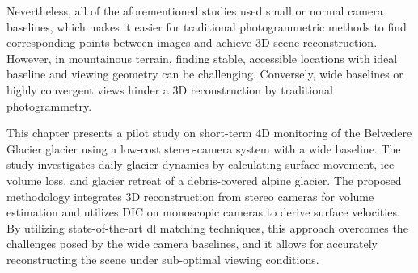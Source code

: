 Nevertheless, all of the aforementioned studies used small or normal camera baselines, which makes it easier for traditional photogrammetric methods to find corresponding
points between images and achieve 3D scene reconstruction.
However, in mountainous terrain, finding stable, accessible locations with ideal baseline and viewing geometry can be challenging.
Conversely, wide baselines or highly convergent views hinder a 3D reconstruction by traditional photogrammetry.



This chapter presents a pilot study on short-term 4D monitoring of the Belvedere Glacier glacier using a low-cost stereo-camera system with a wide baseline. 
The study investigates daily glacier dynamics by calculating surface movement, ice volume loss, and glacier retreat of a debris-covered alpine glacier.
The proposed methodology integrates 3D reconstruction from stereo cameras for volume estimation and utilizes DIC on monoscopic cameras to derive surface velocities.
By utilizing state-of-the-art \ac{dl} matching techniques, this approach overcomes the challenges posed by the wide camera baselines, and it allows for accurately
reconstructing the scene under sub-optimal viewing conditions.

